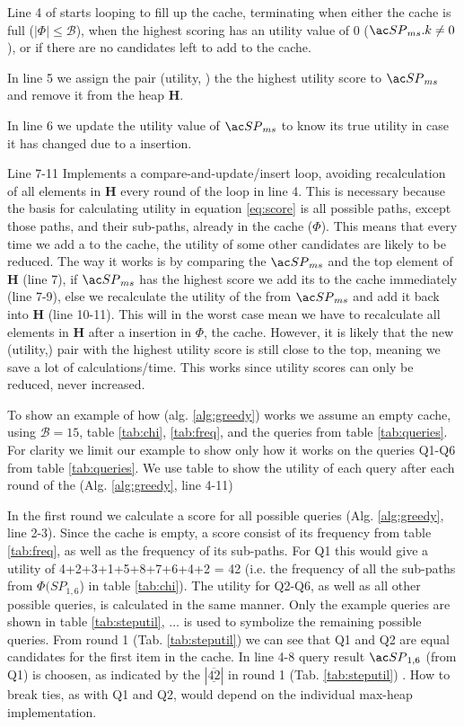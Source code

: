 Line 4 of \salgo starts looping to fill up the cache, terminating when either the cache is full ($| \Phi | \leq  \mathcal{B}$), when the highest scoring \spath has an utility value of 0 ($\spath_{ms}.k \neq 0$), or if there are no \spath candidates left to add to the cache.

In line 5 we assign the pair (utility, \spath) the the highest utility score to $\spath_{ms}$ and remove it from the heap \textbf{H}.

In line 6 we update the utility value of $\spath_{ms}$ to know its true utility in case it has changed due to a \spath insertion.

Line 7-11 Implements a compare-and-update/insert loop, avoiding recalculation of all elements in \textbf{H} every round of the loop in line 4. This is necessary because the basis for calculating utility in equation \ref{eq:score} is all possible paths, except those paths, and their sub-paths, already in the cache ($\Phi$). This means that every time we add a \spath to the cache, the utility of some other candidates are likely to be reduced. The way it works is by comparing the $\spath_{ms}$ and the top element of \textbf{H} (line 7), if $\spath_{ms}$ has the highest score we add its \spath to the cache immediately (line 7-9), else we recalculate the utility of the \spath from $\spath_{ms}$ and add it back into \textbf{H} (line 10-11). This will in the worst case mean we have to recalculate all elements in \textbf{H} after a \spath insertion in $\Phi$, the cache. However, it is likely that the new (utility,\spath) pair with the highest utility score is still close to the top, meaning we save a lot of calculations/time. This works since utility scores can only be reduced, never increased.



To show an example of how \salgo (alg. \ref{alg:greedy}) works we assume an empty cache, using $\mathcal{B}=15$, table \ref{tab:chi}, \ref{tab:freq}, and the queries from table \ref{tab:queries}. For clarity we limit our example to show only how it works on the queries Q1-Q6 from table \ref{tab:queries}. We use table \label{tab:steputil} to show the utility of each query after each round of the \salgo (Alg. \ref{alg:greedy}, line 4-11)

In the first round we calculate a score for all possible queries (Alg. \ref{alg:greedy}, line 2-3). Since the cache is empty, a \spath score consist of its frequency from table \ref{tab:freq}, as well as the frequency of its sub-paths. For Q1 this would give a utility of 4+2+3+1+5+8+7+6+4+2 = 42 (i.e. the frequency of all the sub-paths from $\Phi(SP_{1,6}$) in table \ref{tab:chi}). The utility for Q2-Q6, as well as all other possible queries, is calculated in the same manner. Only the example queries are shown in table \ref{tab:steputil}, $\dots$ is used to symbolize the remaining possible queries. From round 1 (Tab. \ref{tab:steputil}) we can see that Q1 and Q2 are equal candidates for the first item in the cache. In line 4-8 query result $\spath_{1,6}$ (from Q1) is choosen, as indicated by the $| \underline{\overline{42}}|$ in round 1 (Tab. \ref{tab:steputil}) . How to break ties, as with Q1 and Q2, would depend on the individual max-heap implementation. 


